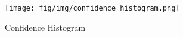 \begin{figure}
    \centering
    \texttt{[image: fig/img/confidence\_histogram.png]}
    \caption{Confidence Histogram}
    \label{fig:active_confidence_histogram}
\end{figure}